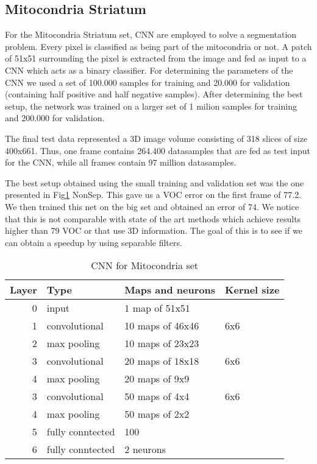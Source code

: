 \subsection{Mitocondria Striatum}
For the Mitocondria Striatum set, CNN are employed to solve a segmentation problem. Every pixel is classified as being part of the mitocondria or not. A patch of 51x51 surrounding the pixel is extracted from the image and fed as input to a CNN which acts as a binary classifier. For determining the parameters of the CNN we used a set of
100.000 samples for training and 20.000 for validation (containing half positive and half negative samples). After determining the best setup, the network was trained on a larger set of 1 milion samples for training and 200.000 for validation.

The final test data represented a 3D image volume consisting of 318 slices of size 400x661. Thus, one frame contains 264.400 datasamples that are fed as test input for the CNN, while all frames contain 97 million datasamples.

The best setup obtained using the small training and validation set was the one presented in Fig\ref{fig:CNN3} NonSep. This gave us a VOC error on the first frame of 77.2. We then trained this net on the big set and obtained an error of 74. We notice that this is not comparable with state of the art methods which achieve results higher than 79 VOC or that use 3D information. The goal of this
is to see if we can obtain a speedup by using separable filters.

\begin{table}
\centering
\begin{tabular}{@{}rlll@{}}\toprule
Layer & Type & Maps and neurons& Kernel size \\ \midrule
0 & input & 1 map of 51x51 &\\
1& convolutional & 10 maps of 46x46 & 6x6\\
2 & max pooling & 10 maps of 23x23 &  \\
3 & convolutional & 20 maps of 18x18& 6x6 \\
4 & max pooling & 20 maps of 9x9& \\ 
3 & convolutional & 50 maps of 4x4& 6x6 \\
4 & max pooling & 50 maps of 2x2& \\ 
5 & fully conntected& 100 & \\
6 & fully conntected & 2 neurons & \\ \bottomrule
\end{tabular}
\caption{CNN for Mitocondria set}
\label{fig:CNN3}
\end{table}

